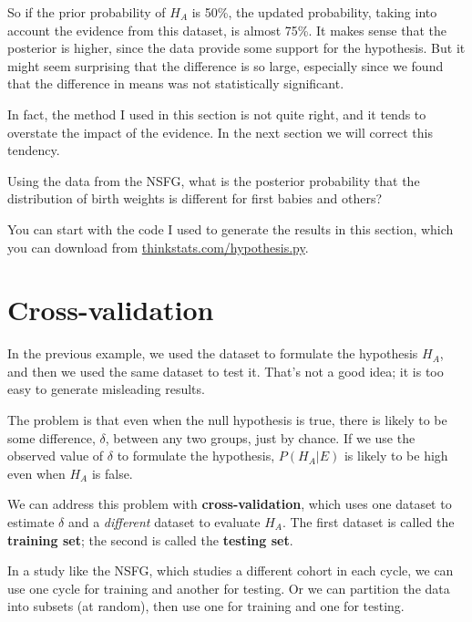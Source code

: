 \documentclass[12pt]{book}
\begin{document}
So if the prior probability of $H_A$ is 50\%, the updated
probability, taking into account the evidence from this dataset,
is almost 75\%.  It makes sense that the posterior
is higher, since the data provide some support for the hypothesis.
But it might seem surprising that the difference is so large,
especially since we found that the difference in means was not
statistically significant.

In fact, the method I used in this section is not quite right, and
it tends to overstate the impact of the evidence.  In the next section
we will correct this tendency.

\begin{ex}

Using the data from the NSFG, what is the posterior probability that
the distribution of birth weights is different for first babies and
others?


You can start with the code I used to generate the results in this
section, which you can download from \url{thinkstats.com/hypothesis.py}.

\end{ex}


\section{Cross-validation}

In the previous example, we used the dataset to formulate the
hypothesis $H_A$, and then we used the same dataset to test it.
That's not a good idea; it is too easy to generate misleading results.

The problem is that even when the null hypothesis is true, there is
likely to be some difference, $\delta$, between any two groups, just
by chance.  If we use the observed value of $\delta$ to formulate
the hypothesis, $P(H_A | E)$ is likely to be high even when $H_A$ is
false.

We can address this problem with {\bf cross-validation}, which uses
one dataset to estimate $\delta$ and a {\em different} dataset to
evaluate $H_A$.  The first dataset is called the {\bf training set};
the second is called the {\bf testing set}.


In a study like the NSFG, which studies a different cohort in each
cycle, we can use one cycle for training and another for testing.
Or we can partition the data into subsets (at random), then use
one for training and one for testing.
\end{document}
